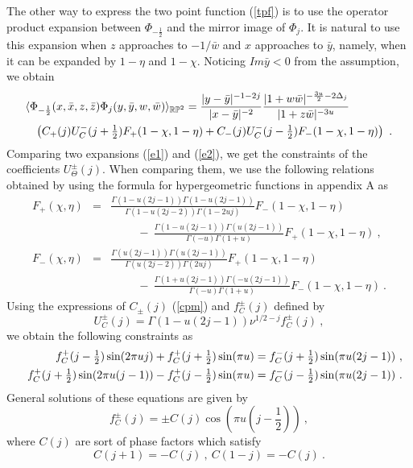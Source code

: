 \documentclass[a4paper,12pt]{article}
\newcommand{\brp}{{\mathbb R \mathbb P}^2}
\newcommand{\nn}{\nonumber\\}
\begin{document}
The other way to express the two point function (\ref{tpf}) is to use
the operator product expansion between $\Phi_{-\frac{1}{2}}$ and 
the mirror image of $\Phi_j$. It is
natural to use this expansion when $z$ approaches to $-1/\bar{w}$ and $x$
approaches to $\bar{y}$, namely, when it can be expanded 
by $1-\eta$ and $1 - \chi$. 
Noticing $Im \bar{y} < 0$ from the assumption, we obtain
\begin{eqnarray}
 \lefteqn{ \langle \Phi_{-\frac{1}{2}} (x,\bar{x},z,\bar{z}) 
    \Phi_{j} (y,\bar{y},w,\bar{w}) \rangle_{\brp} = 
  \frac{|y - \bar{y} |^{-1-2j}}{|x - \bar{y}|^{-2}} 
  \frac{|1 + w \bar{w} |^{-\frac{3u}{2}-2\Delta_j}}{|1 + z \bar{w} |^{-3u}}}
  \nn && 
   \left(
    C_+ (j) U^-_C (j+ \textstyle \frac{1}{2}) F_+(1-\chi, 1-\eta) +  
    C_- (j) U^-_C (j- \textstyle \frac{1}{2}) F_-(1-\chi, 1-\eta)
   \right) ~.
\label{e2}
\end{eqnarray} 
Comparing two expansions (\ref{e1}) and (\ref{e2}), we get the
constraints of the coefficients $U^{\pm}_{\Theta} (j)$.
When comparing them, 
we use the following relations obtained by using the formula for
hypergeometric functions in appendix A as
\begin{eqnarray}
 F_+ (\chi,\eta) &=& \frac{\Gamma (1 - u (2j-1)) \Gamma (1 - u (2j -1))}{
           \Gamma (1 - u ( 2j -2)) \Gamma (1 - 2uj)} 
       F_- (1 - \chi, 1 - \eta) \nn
  && \hspace{1cm} -~ \frac{\Gamma (1 - u (2j-1)) \Gamma (u (2j -1))}{
           \Gamma (- u) \Gamma (1+u)} 
       F_+ (1 - \chi, 1 - \eta) ~,\nn
 F_- (\chi,\eta) &=&  \frac{\Gamma (u (2j-1)) \Gamma (u (2j -1))}{
           \Gamma (u ( 2j -2)) \Gamma (2uj)} 
       F_+ (1 - \chi, 1 - \eta) \nn
  && \hspace{1cm} -~ \frac{\Gamma (1 + u (2j-1)) \Gamma (- u (2j -1))}{
           \Gamma (- u) \Gamma (1+u)} 
       F_- (1 - \chi, 1 - \eta) ~.
\end{eqnarray}
Using the expressions of $C_{\pm} (j)$ (\ref{cpm}) and $f^{\pm}_C (j)$
defined by
\begin{equation}
 U^{\pm}_{C} (j) = \Gamma (1 - u (2j - 1)) \nu^{1/2 - j} f^{\pm}_{C} (j) ~,
\end{equation}
we obtain the following constraints as
\begin{eqnarray}
&&\hspace{0.7cm} f^+_C (j - \textstyle \frac{1}{2}) \sin (2 \pi u j) +
 f^+_C (j + \textstyle \frac{1}{2}) \sin (\pi u) =
 f^-_C (j + \textstyle \frac{1}{2}) \sin (\pi u (2j-1))~, \nn
&& f^+_C (j + \textstyle \frac{1}{2}) \sin (2 \pi u (j-1) ) -
 f^+_C (j - \textstyle \frac{1}{2}) \sin (\pi u) =
 f^-_C (j - \textstyle \frac{1}{2}) \sin (\pi u (2j -1))~.
\end{eqnarray}
General solutions of these equations are given by 
\begin{equation}
 f^{\pm}_C (j) = \pm C (j) 
  \cos (\pi u ( j - \textstyle \frac{1}{2})) ~,
\end{equation}
where $C (j)$ are sort of phase factors which satisfy
\begin{equation}
 C (j+1) = - C(j) ~,~ C(1-j) = - C(j) ~.
\label{PC}
\end{equation} 
\end{document}

